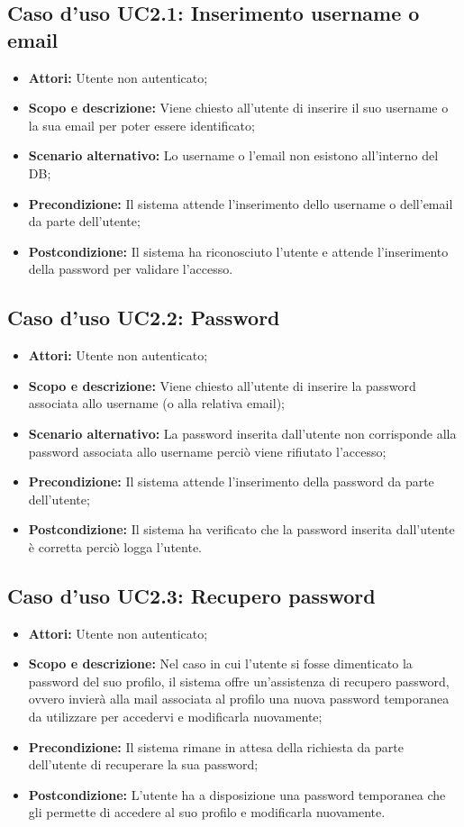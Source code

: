 \documentclass[12pt,a4paper,titlepage]{article}
\begin{document}
\subsection{Caso d'uso UC2.1: Inserimento username o email}
\begin{itemize}
	\item \textbf{Attori: }Utente non autenticato;
	\item \textbf{Scopo e descrizione: }Viene chiesto all'utente di inserire il suo username o la sua email per poter essere identificato;
	\item \textbf{Scenario alternativo: }Lo username o l'email non esistono all'interno del DB;
	\item \textbf{Precondizione: }Il sistema attende l'inserimento dello username o dell'email da parte dell'utente;
	\item \textbf{Postcondizione: }Il sistema ha riconosciuto l'utente e attende l'inserimento della password per validare l'accesso.
\end{itemize}
\subsection{Caso d'uso UC2.2: Password}
\begin{itemize}
	\item \textbf{Attori: }Utente non autenticato;
	\item \textbf{Scopo e descrizione: }Viene chiesto all'utente di inserire la password associata allo username (o alla relativa email);
	\item \textbf{Scenario alternativo: }La password inserita dall'utente non corrisponde alla password associata allo username perciò viene rifiutato l'accesso;
	\item \textbf{Precondizione: }Il sistema attende l'inserimento della password da parte dell'utente;
	\item \textbf{Postcondizione: }Il sistema ha verificato che la password inserita dall'utente è corretta perciò logga l'utente.
\end{itemize}
\subsection{Caso d'uso UC2.3: Recupero password}
\begin{itemize}
	\item \textbf{Attori: }Utente non autenticato;
	\item \textbf{Scopo e descrizione: }Nel caso in cui l'utente si fosse dimenticato la password del suo profilo, il sistema offre un'assistenza di recupero password, ovvero invierà alla mail associata al profilo una nuova password temporanea da utilizzare per accedervi e modificarla nuovamente;
	\item \textbf{Precondizione: }Il sistema rimane in attesa della richiesta da parte dell'utente di recuperare la sua password;
	\item \textbf{Postcondizione: }L'utente ha a disposizione una password temporanea che gli permette di accedere al suo profilo e modificarla nuovamente.
\end{itemize}
\end{document}
